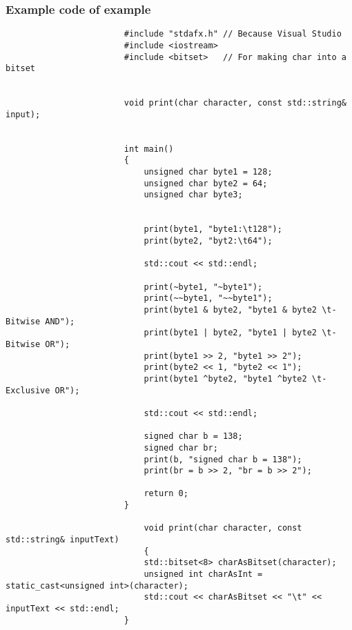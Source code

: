 \documentclass{report}
\begin{document}
				\subsubsection{Example code of example}
				\begin{minipage}{\linewidth}
					\begin{lstlisting}
						#include "stdafx.h"	// Because Visual Studio
						#include <iostream>
						#include <bitset>	// For making char into a bitset
						
						
						void print(char character, const std::string& input);
						
						
						int main()
						{
							unsigned char byte1 = 128;
							unsigned char byte2 = 64;
							unsigned char byte3;
							
							
							print(byte1, "byte1:\t128");
							print(byte2, "byt2:\t64");
							
							std::cout << std::endl;
							
							print(~byte1, "~byte1");
							print(~~byte1, "~~byte1");
							print(byte1 & byte2, "byte1 & byte2 \t- Bitwise AND");
							print(byte1 | byte2, "byte1 | byte2 \t- Bitwise OR");
							print(byte1 >> 2, "byte1 >> 2");
							print(byte2 << 1, "byte2 << 1");
							print(byte1 ^byte2, "byte1 ^byte2 \t- Exclusive OR");
							
							std::cout << std::endl;
							
							signed char b = 138;
							signed char br;
							print(b, "signed char b = 138");
							print(br = b >> 2, "br = b >> 2");
							
							return 0;
						}
						
							void print(char character, const std::string& inputText)
							{
							std::bitset<8> charAsBitset(character);
							unsigned int charAsInt = static_cast<unsigned int>(character);
							std::cout << charAsBitset << "\t" << inputText << std::endl;
						}
					\end{lstlisting}
				\end{minipage}
				
\end{document}
